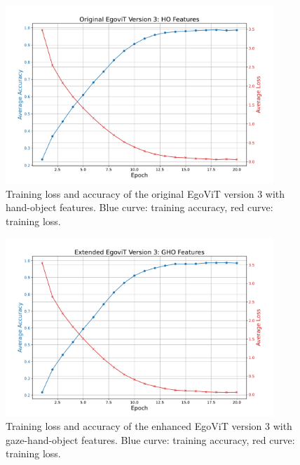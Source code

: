 \begin{figure}[htbp]
    \centering
    \includegraphics[width=0.9\textwidth]{graphics/figure7}
    \caption{Training loss and accuracy of the original EgoViT version 3 with hand-object features. Blue curve: training accuracy, red curve: training loss.}
    \label{fig:egovit_v3_HO}
\end{figure}
\clearpage
\begin{figure}
    \centering
    \includegraphics[width=0.9\textwidth]{graphics/figure8}
    \caption{Training loss and accuracy of the enhanced EgoViT version 3 with gaze-hand-object features. Blue curve: training accuracy, red curve: training loss.}
    \label{fig:egovit_v3_GHO}
\end{figure}
